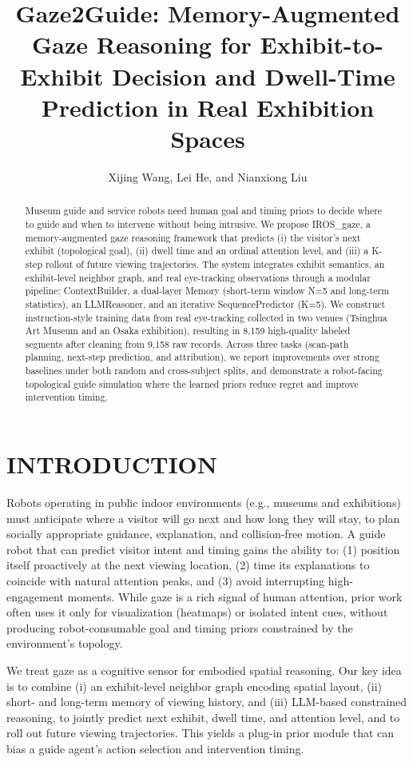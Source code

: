 \documentclass{article}
\title{Gaze2Guide: Memory-Augmented Gaze Reasoning for Exhibit-to-Exhibit Decision and Dwell-Time Prediction in Real Exhibition Spaces}
\author{Xijing Wang, Lei He, and Nianxiong Liu}
\date{}
\begin{document}
\maketitle

\begin{abstract}
Museum guide and service robots need human goal and timing priors to decide where to guide and when to intervene without being intrusive. We propose IROS\_gaze, a memory-augmented gaze reasoning framework that predicts (i) the visitor's next exhibit (topological goal), (ii) dwell time and an ordinal attention level, and (iii) a K-step rollout of future viewing trajectories. The system integrates exhibit semantics, an exhibit-level neighbor graph, and real eye-tracking observations through a modular pipeline: ContextBuilder, a dual-layer Memory (short-term window N=5 and long-term statistics), an LLMReasoner, and an iterative SequencePredictor (K=5). We construct instruction-style training data from real eye-tracking collected in two venues (Tsinghua Art Museum and an Osaka exhibition), resulting in 8,159 high-quality labeled segments after cleaning from 9,158 raw records. Across three tasks (scan-path planning, next-step prediction, and attribution), we report improvements over strong baselines under both random and cross-subject splits, and demonstrate a robot-facing topological guide simulation where the learned priors reduce regret and improve intervention timing.
\end{abstract}

\section{INTRODUCTION}

Robots operating in public indoor environments (e.g., museums and exhibitions) must anticipate where a visitor will go next and how long they will stay, to plan socially appropriate guidance, explanation, and collision-free motion. A guide robot that can predict visitor intent and timing gains the ability to: (1) position itself proactively at the next viewing location, (2) time its explanations to coincide with natural attention peaks, and (3) avoid interrupting high-engagement moments. While gaze is a rich signal of human attention, prior work often uses it only for visualization (heatmaps) or isolated intent cues, without producing robot-consumable goal and timing priors constrained by the environment's topology.

We treat gaze as a cognitive sensor for embodied spatial reasoning. Our key idea is to combine (i) an exhibit-level neighbor graph encoding spatial layout, (ii) short- and long-term memory of viewing history, and (iii) LLM-based constrained reasoning, to jointly predict next exhibit, dwell time, and attention level, and to roll out future viewing trajectories. This yields a plug-in prior module that can bias a guide agent's action selection and intervention timing.
\end{document}
